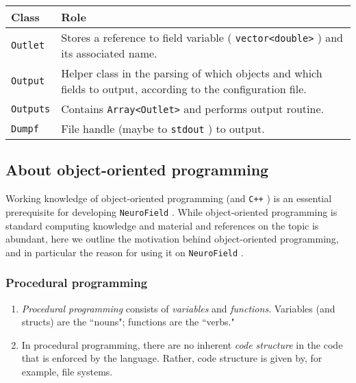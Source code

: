 \documentclass[12pt,a4paper]{article}
\newcommand{\type}[1]{ {\small\small\tt #1} }
\newcommand{\NF}[0]{ \type{NeuroField}}
\begin{document}
\begin{tabular}{l p{16cm}}
	Class&Role\\
	\hline
	\type{Outlet}&Stores a reference to field variable (\type{vector<double>}) and its associated name.\\
	\type{Output}&Helper class in the parsing of which objects and which fields to output, according to the configuration file.\\
	\type{Outputs}&Contains \type{Array<Outlet>} and performs output routine.\\
	\type{Dumpf}&File handle (maybe to \type{stdout}) to output.
\end{tabular}



\subsection{About object-oriented programming}

Working knowledge of object-oriented programming (and \type{C++}) is an essential prerequisite for developing \NF. While object-oriented programming is standard computing knowledge and material and references on the topic is abundant, here we outline the motivation behind object-oriented programming, and in particular the reason for using it on \NF.

\subsubsection{Procedural programming}

\begin{enumerate}

\item \emph{Procedural programming} consists of \emph{variables} and \emph{functions}. Variables (and structs) are the ``nouns"; functions are the ``verbs."

\item In procedural programming, there are no inherent \emph{code structure} in the code that is enforced by the language. Rather, code structure is given by, for example, file systems.
\end{enumerate}
\end{document}

